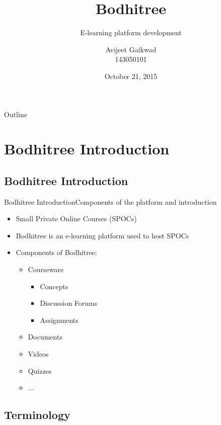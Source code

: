 \documentclass{beamer}
\title{Bodhitree}
\subtitle{E-learning platform development}
\author{Avijeet Gaikwad \\ 143050101}
\institute[] %
{  Guided by \\
	\vspace{0.1cm}
	{\small Prof. Kameswari Chebrolu} \\
	and \\
	{\small Prof. Bhaskaran Raman} \\
	\vspace{0.5cm}
	Department of Computer Science and Engineering\\
  IIT Bombay}
\date{October 21, 2015}
\begin{document}
\begingroup
\begin{frame}[plain]
  \titlepage
\end{frame}
\endgroup

\begin{frame}{Outline}
  \tableofcontents
\end{frame}

\section[]{Bodhitree Introduction}

\subsection*{Bodhitree Introduction}

\begin{frame}{Bodhitree Introduction}{Components of the platform and introduction}
  \begin{itemize}
  \item {
    Small Private Online Courses (SPOCs)
  }
  \item {
    Bodhitree is an e-learning platform used to host SPOCs
  }
  \item {
  	Components of Bodhitree:
  	\begin{itemize}
  		\item Courseware
  		\begin{itemize}
  			\item Concepts
  			\item Discussion Forums
  			\item Assignments
  		\end{itemize}
  		\item Documents
  		\item Videos
  		\item Quizzes
  		\item ...
  	\end{itemize}
  }
  \end{itemize}
\end{frame}

\subsection*{Terminology}
\end{document}
